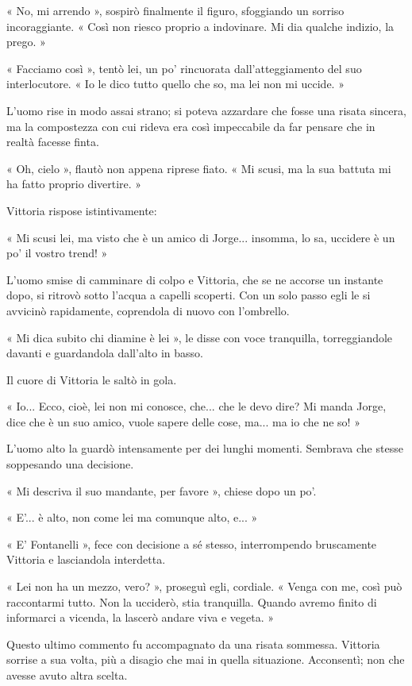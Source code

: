 « No, mi arrendo », sospirò finalmente il figuro, sfoggiando un sorriso incoraggiante. « Così non riesco proprio a indovinare. Mi dia qualche indizio, la prego. »

« Facciamo così », tentò lei, un po' rincuorata dall'atteggiamento del suo interlocutore. « Io le dico tutto quello che so, ma lei non mi uccide. »

L'uomo rise in modo assai strano; si poteva azzardare che fosse una risata sincera, ma la compostezza con cui rideva era così impeccabile da far pensare che in realtà facesse finta.

« Oh, cielo », flautò non appena riprese fiato. « Mi scusi, ma la sua battuta mi ha fatto proprio divertire. »

Vittoria rispose istintivamente:

« Mi scusi lei, ma visto che è un amico di Jorge... insomma, lo sa, uccidere è un po' il vostro trend! »

L'uomo smise di camminare di colpo e Vittoria, che se ne accorse un instante dopo, si ritrovò sotto l'acqua a capelli scoperti. Con un solo passo egli le si avvicinò rapidamente, coprendola di nuovo con l'ombrello.

« Mi dica subito chi diamine è lei », le disse con voce tranquilla, torreggiandole davanti e guardandola dall'alto in basso.

Il cuore di Vittoria le saltò in gola.

« Io... Ecco, cioè, lei non mi conosce, che... che le devo dire? Mi manda Jorge, dice che è un suo amico, vuole sapere delle cose, ma... ma io che ne so! »

L'uomo alto la guardò intensamente per dei lunghi momenti. Sembrava che stesse soppesando una decisione.

« Mi descriva il suo mandante, per favore », chiese dopo un po'.

« E'... è alto, non come lei ma comunque alto, e... »

« E' Fontanelli », fece con decisione a sé stesso, interrompendo bruscamente Vittoria e lasciandola interdetta.

« Lei non ha un mezzo, vero? », proseguì egli, cordiale. « Venga con me, così può raccontarmi tutto. Non la ucciderò, stia tranquilla. Quando avremo finito di informarci a vicenda, la lascerò andare viva e vegeta. »

Questo ultimo commento fu accompagnato da una risata sommessa. Vittoria sorrise a sua volta, più a disagio che mai in quella situazione. Acconsentì; non che avesse avuto altra scelta.

